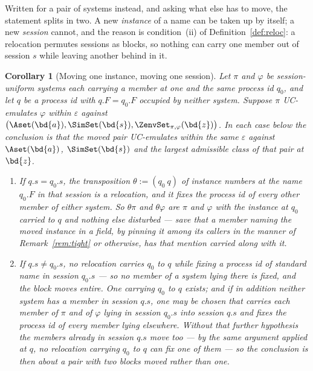 \documentclass[10pt,oneside,openany]{book}
\theoremstyle{accentdef}
\theoremstyle{accentplain}
\newtheorem{corollary}[definition]{Corollary}
\begin{document}
Written for a pair of systems instead, and asking what else has to move, the statement splits in
two. A new \emph{instance} of a name can be taken up by itself; a new \emph{session} cannot, and
the reason is condition~(ii) of Definition~\ref{def:reloc}: a relocation permutes sessions as
blocks, so nothing can carry one member out of session $s$ while leaving another behind in it.

\begin{corollary}[Moving one instance, moving one session]\label{cor:moveone}
Let $\pi$ and $\varphi$ be session-uniform systems each carrying a member at one and the same process
id $q_0$, and let $q$ be a process id with $q.F = q_0.F$ occupied by neither system. Suppose $\pi$
UC-emulates $\varphi$ within $\varepsilon$ against
$\bigl(\Aset(\bd{a}),\SimSet(\bd{s}),\ZenvSet_{\pi,\varphi}(\bd{z})\bigr)$. In each case below the
conclusion is that the moved pair UC-emulates within the same $\varepsilon$ against $\Aset(\bd{a})$,
$\SimSet(\bd{s})$ and the largest admissible class of that pair at $\bd{z}$.
\begin{enumerate}[label=(\roman*),leftmargin=2.2em]
  \item If $q.s = q_0.s$, the transposition $\theta := (q_0\ q)$ of instance numbers at the name
        $q_0.F$ in that session is a relocation, and it fixes the process id of every other member
        of either system. So $\theta\pi$ and $\theta\varphi$ are $\pi$ and $\varphi$ with the
        instance at $q_0$ carried to $q$ and nothing else disturbed --- save that a member naming
        the moved instance in a field, by pinning it among its callers in the manner of
        Remark~\ref{rem:tight} or otherwise, has that mention carried along with it.
  \item If $q.s \neq q_0.s$, no relocation carries $q_0$ to $q$
        while fixing a process id of standard name in session $q_0.s$ --- so no member of a system
        lying there is fixed, and the block moves entire. One carrying $q_0$
        to $q$ exists; and if in addition neither system has a member in session $q.s$, one may be
        chosen that carries each member of $\pi$ and of $\varphi$ lying in session $q_0.s$ into
        session $q.s$ and fixes the process id of every member lying elsewhere. Without that
        further hypothesis the members already in session $q.s$ move too --- by the same argument
        applied at $q$, no relocation carrying $q_0$ to $q$ can fix one of them --- so the
        conclusion is then about a pair with two blocks moved rather than one.
\end{enumerate}
\end{corollary}
\end{document}
